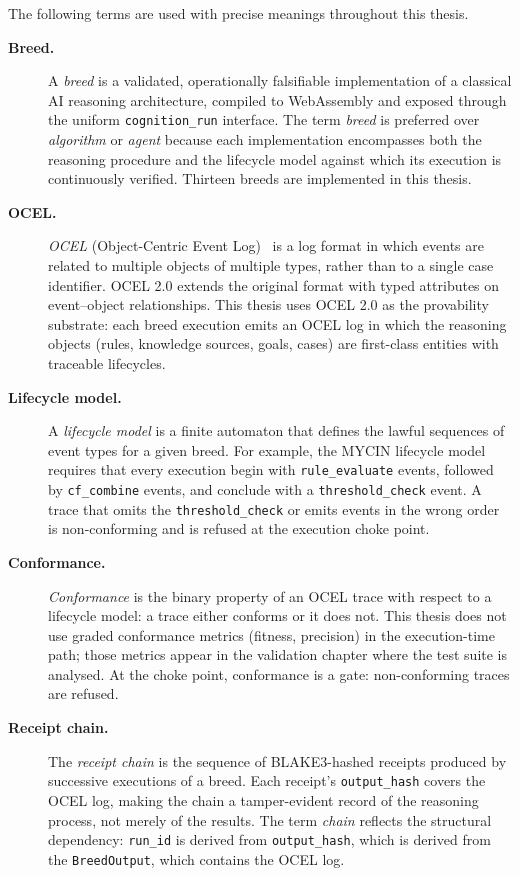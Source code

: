 The following terms are used with precise meanings throughout this thesis.

\begin{description}

\item[\textbf{Breed.}]
A \emph{breed} is a validated, operationally falsifiable implementation of a classical AI
reasoning architecture, compiled to WebAssembly and exposed through the uniform
\texttt{cognition\_run} interface.
The term \emph{breed} is preferred over \emph{algorithm} or \emph{agent} because each
implementation encompasses both the reasoning procedure and the lifecycle model against
which its execution is continuously verified.
Thirteen breeds are implemented in this thesis.

\item[\textbf{OCEL.}]
\emph{OCEL} (Object-Centric Event Log)~\cite{ghahfarokhi2021ocel} is a log format in
which events are related to multiple objects of multiple types, rather than to a single
case identifier.
OCEL 2.0 extends the original format with typed attributes on event--object relationships.
This thesis uses OCEL 2.0 as the provability substrate: each breed execution emits an
OCEL log in which the reasoning objects (rules, knowledge sources, goals, cases) are
first-class entities with traceable lifecycles.

\item[\textbf{Lifecycle model.}]
A \emph{lifecycle model} is a finite automaton that defines the lawful sequences of event
types for a given breed.
For example, the MYCIN lifecycle model requires that every execution begin with
\texttt{rule\_evaluate} events, followed by \texttt{cf\_combine} events, and conclude
with a \texttt{threshold\_check} event.
A trace that omits the \texttt{threshold\_check} or emits events in the wrong order is
non-conforming and is refused at the execution choke point.

\item[\textbf{Conformance.}]
\emph{Conformance} is the binary property of an OCEL trace with respect to a lifecycle
model: a trace either conforms or it does not.
This thesis does not use graded conformance metrics (fitness, precision) in the
execution-time path; those metrics appear in the validation chapter where the test suite
is analysed.
At the choke point, conformance is a gate: non-conforming traces are refused.

\item[\textbf{Receipt chain.}]
The \emph{receipt chain} is the sequence of BLAKE3-hashed receipts produced by successive
executions of a breed.
Each receipt's \texttt{output\_hash} covers the OCEL log, making the chain a
tamper-evident record of the reasoning process, not merely of the results.
The term \emph{chain} reflects the structural dependency: \texttt{run\_id} is derived
from \texttt{output\_hash}, which is derived from the \texttt{BreedOutput}, which
contains the OCEL log.


\end{description}
